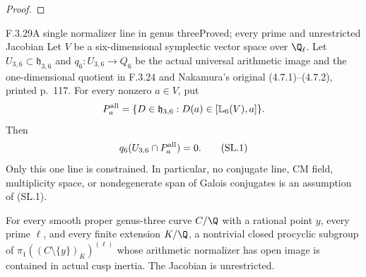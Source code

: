 \begin{proof}
\end{proof}

\begin{result}{F.3.29}{A single normalizer line in genus three}{Proved; every prime and unrestricted Jacobian}
Let $V$ be a six-dimensional symplectic vector space over $\Q_\ell$.
Let $U_{3,6}\subset\mathfrak h_{3,6}$ and
$q_6:U_{3,6}\to Q_6$ be the actual universal arithmetic image and
the one-dimensional quotient in F.3.24 and Nakamura's original
(4.7.1)--(4.7.2), printed p.~117.
For every nonzero $a\in V$, put
\[
 P_a^{\rm all}=\{D\in\mathfrak h_{3,6}:
                         D(a)\in[\mathbb L_6(V),a]\}.
\]
Then
\[
                    q_6(U_{3,6}\cap P_a^{\rm all})=0.       \tag{SL.1}
\]
Only this one line is constrained. In particular, no conjugate line,
CM field, multiplicity space, or nondegenerate span of Galois conjugates
is an assumption of (SL.1).

For every smooth proper genus-three curve $C/\Q$ with a rational
point $y$, every prime $\ell$, and every finite extension $K/\Q$,
a nontrivial closed procyclic subgroup of
$\pi_1((C\setminus\{y\})_{\overline K})^{(\ell)}$
whose arithmetic normalizer has open image is contained in actual
cusp inertia. The Jacobian is unrestricted.
\end{result}
